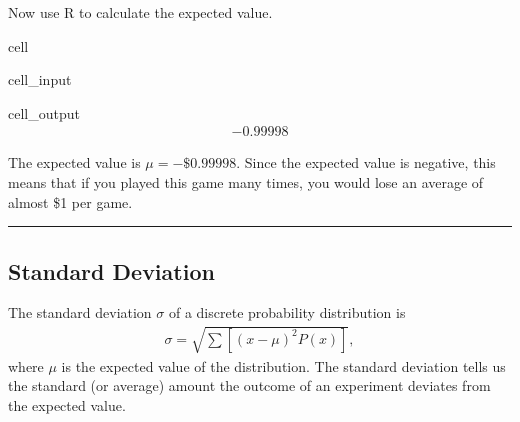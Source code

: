 \documentclass[letterpaper,10pt,english]{jupyterBook}
\begin{document}
\sphinxAtStartPar
Now use R to calculate the expected value.

\begin{sphinxuseclass}{cell}\begin{sphinxVerbatimInput}

\begin{sphinxuseclass}{cell_input}
\begin{sphinxVerbatim}[commandchars=\\\{\}]

\end{sphinxVerbatim}

\end{sphinxuseclass}\end{sphinxVerbatimInput}
\begin{sphinxVerbatimOutput}

\begin{sphinxuseclass}{cell_output}\begin{equation*}
\begin{split}-0.99998\end{split}
\end{equation*}
\end{sphinxuseclass}\end{sphinxVerbatimOutput}

\end{sphinxuseclass}
\sphinxAtStartPar
The expected value is \(\mu = -\$0.99998\). Since the expected value is negative, this means that if you played this game many times, you would lose an average of almost \$1 per game.


\bigskip\hrule\bigskip



\subsection{Standard Deviation}
\label{\detokenize{Ch3 Probability/3.5 Discrete Probability Distributions:standard-deviation}}
\sphinxAtStartPar
The standard deviation \(\sigma\) of a discrete probability distribution is
\begin{equation*}
\begin{split} \sigma = \sqrt{\sum\left[(x - \mu)^2 P(x)\right]}, \end{split}
\end{equation*}
\sphinxAtStartPar
where \(\mu\) is the expected value of the distribution. The standard deviation tells us the standard (or average) amount the outcome of an experiment deviates from the expected value.
\end{document}
